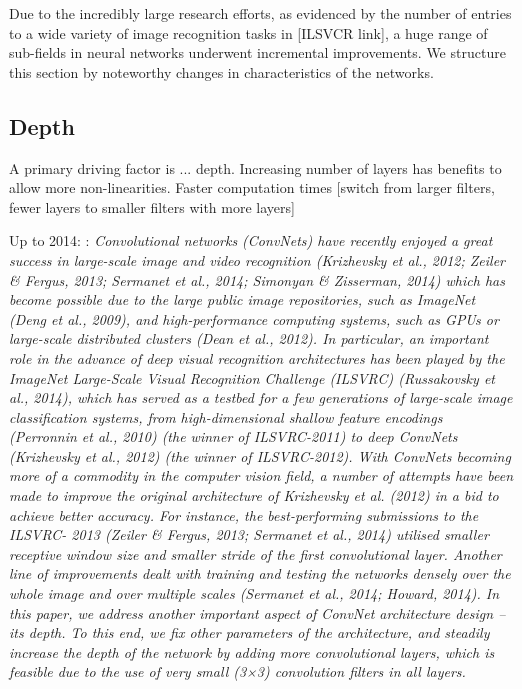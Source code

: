\documentclass[12pt]{llncs}
\begin{document}
Due to the incredibly large research efforts, as evidenced by the number of entries to a wide variety of image recognition tasks in [ILSVCR link], a huge range of sub-fields in neural networks underwent incremental improvements. We structure this section by noteworthy changes in characteristics of the networks.

\subsection{Depth}
A primary driving factor is ... depth. Increasing number of layers has benefits to allow more non-linearities. Faster computation times [switch from larger filters, fewer layers to smaller filters with more layers]



Up to 2014:
\cite{simonyan2014very}:
\emph{Convolutional networks (ConvNets) have recently enjoyed a great success in large-scale image
and video recognition (Krizhevsky et al., 2012; Zeiler \& Fergus, 2013; Sermanet et al., 2014;
Simonyan \& Zisserman, 2014) which has become possible due to the large public image repositories,
such as ImageNet (Deng et al., 2009), and high-performance computing systems, such as GPUs
or large-scale distributed clusters (Dean et al., 2012). In particular, an important role in the advance
of deep visual recognition architectures has been played by the ImageNet Large-Scale Visual Recognition
Challenge (ILSVRC) (Russakovsky et al., 2014), which has served as a testbed for a few
generations of large-scale image classification systems, from high-dimensional shallow feature encodings
(Perronnin et al., 2010) (the winner of ILSVRC-2011) to deep ConvNets (Krizhevsky et al.,
2012) (the winner of ILSVRC-2012).
With ConvNets becoming more of a commodity in the computer vision field, a number of attempts
have been made to improve the original architecture of Krizhevsky et al. (2012) in a
bid to achieve better accuracy. For instance, the best-performing submissions to the ILSVRC-
2013 (Zeiler \& Fergus, 2013; Sermanet et al., 2014) utilised smaller receptive window size and
smaller stride of the first convolutional layer. Another line of improvements dealt with training
and testing the networks densely over the whole image and over multiple scales (Sermanet et al.,
2014; Howard, 2014). In this paper, we address another important aspect of ConvNet architecture
design – its depth. To this end, we fix other parameters of the architecture, and steadily increase the
depth of the network by adding more convolutional layers, which is feasible due to the use of very
small (3×3) convolution filters in all layers.}
\end{document}
